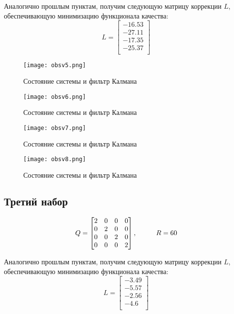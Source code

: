 Аналогично прошлым пунктам, получим следующую матрицу коррекции $L$, обеспечивающую минимизацию функционала качества:
$$
   L = \begin{bmatrix}
    -16.53 \\
    -27.11 \\
    -17.35 \\
    -25.37 \\
\end{bmatrix}
$$


\begin{figure}[ht]
  \centering
  \texttt{[image: obsv5.png]}
  \caption{Состояние системы и фильтр Калмана}
\end{figure}
\newpage
\begin{figure}[ht]
  \centering
  \texttt{[image: obsv6.png]}
  \caption{Состояние системы и фильтр Калмана}
\end{figure}
\begin{figure}[ht]
  \centering
  \texttt{[image: obsv7.png]}
  \caption{Состояние системы и фильтр Калмана}
\end{figure}
\newpage
\begin{figure}[ht]
  \centering
  \texttt{[image: obsv8.png]}
  \caption{Состояние системы и фильтр Калмана}
\end{figure}


\subsection{Третий набор}
$$
  Q = \begin{bmatrix}
                    2 & 0 & 0 & 0\\
                    0 & 2 & 0 & 0\\
                    0 & 0 & 2 & 0\\
                    0 & 0 & 0 & 2
                      \end{bmatrix}, \hspace*{1cm} R=60
$$

Аналогично прошлым пунктам, получим следующую матрицу коррекции $L$, обеспечивающую минимизацию функционала качества:
$$
   L = \begin{bmatrix}
    -3.49 \\
    -5.57 \\
    -2.56 \\
    -4.6 \\
\end{bmatrix}
$$


